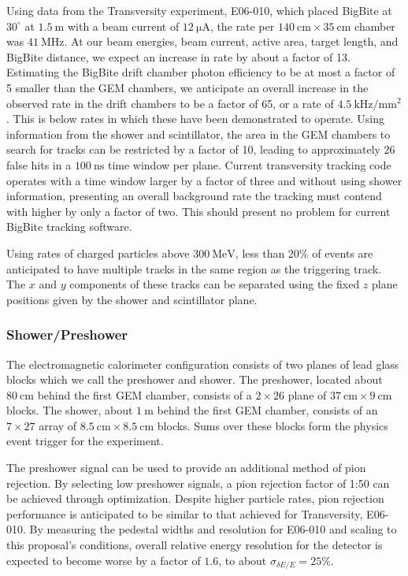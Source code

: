 Using data from the Transversity experiment, E06-010, which placed BigBite at $30^\circ$ at
$1.5~\mathrm{m}$ with a beam current of $12~\mathrm{\mu A}$, the rate per $140~\mathrm{cm}\times35~\mathrm{cm}$ chamber was $41~\mathrm{MHz}$.  
At our beam energies, beam current, active area, target length, and BigBite distance, we expect an increase in rate by about a factor of 13.  
Estimating the BigBite drift chamber photon efficiency to be at most a factor of 5 smaller than the GEM chambers, 
we anticipate an overall increase in the observed rate in the drift chambers to be a factor of 65, or a rate
of $4.5~\mathrm{kHz/mm^2}$. 
This is below rates in which these have been demonstrated to operate.
Using information from the shower and scintillator, the area in the GEM chambers to search for tracks can be restricted
 by a factor of 10, leading to approximately 26 false hits in a $100~\mathrm{ns}$ time window per plane.  
Current transversity tracking code operates with a time window larger by a factor of three
and without using shower information, presenting an overall background rate the tracking must
contend with higher by only a factor of two.  
This should present no problem for current BigBite tracking software.

Using rates of charged particles above $300~\mathrm{MeV}$, less than 20\% of events are anticipated 
to have multiple tracks in the same region as the triggering track.  
The $x$ and $y$ components of  these tracks can be separated using the fixed $z$ plane positions given by the shower and scintillator plane.
\fi

\subsubsection{Shower/Preshower}

The electromagnetic calorimeter configuration consists of two planes of lead glass blocks which we call the preshower and shower.  
The preshower, located about $80~\mathrm{cm}$ behind the first GEM chamber, consists of a $2\times26$ plane of $37~\mathrm{cm}\times 9~\mathrm{cm}$ blocks.  
The shower, about $1~\mathrm{m}$ behind the first GEM chamber, consists of an $7\times27$ array of $8.5~\mathrm{cm}\times8.5~\mathrm{cm}$ blocks.  Sums over these blocks form the physics event trigger for the experiment.

The preshower signal can be used to provide an additional method of pion rejection.  
By selecting low preshower signals, a pion rejection factor of 1:50 can be achieved through optimization.  
Despite higher particle rates, pion rejection performance is anticipated to be similar to that achieved for Transversity, E06-010.  
By measuring the pedestal widths and resolution for E06-010 and scaling to this proposal's conditions, overall relative energy resolution for the detector is expected to become worse by a factor of $1.6$, to about $\sigma_{\delta E/E} = 25\%$.

